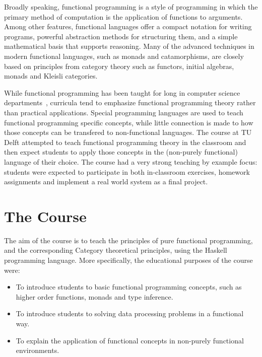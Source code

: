 \documentclass[conference]{IEEEtran}
\begin{document}
Broadly speaking, functional programming is a style of programming in which the
primary method of computation is the application of functions to arguments.
Among other features, functional languages offer a compact notation for writing
programs, powerful abstraction methods for structuring them, and a simple
mathematical basis that supports reasoning. Many of the advanced techniques in
modern functional languages, such as monads and catamorphisms, are closely based
on principles from category theory such as functors, initial algebras, monads
and Kleisli categories.

While functional programming has been taught for long in computer science
departments~\cite{Joost93}, curricula tend to emphasize functional programming theory rather
than practical applications. Special programming languages are used to teach
functional programming specific concepts, while little connection is made to how
those concepts can be transfered to non-functional languages.  The course at TU
Delft attempted to teach functional programming theory in the classroom and then
expect students to apply those concepts in the (non-purely functional) language
of their choice. The course had a very strong teaching by example focus:
students were expected to participate in both in-classroom exercises, homework
assignments and implement a real world system as a final project.

\section{The Course}

The aim of the course is to teach the principles of pure functional
programming, and the corresponding Category theoretical principles, using the
Haskell programming language. More specifically, the educational purposes
of the course were:

\begin{itemize}

  \item To introduce students to basic functional programming concepts, such
    as higher order functions, monads and type inference.

  \item To introduce students to solving data processing problems in a 
    functional way.

  \item To explain the application of functional concepts in non-purely
    functional environments.

\end{itemize}
\end{document}
